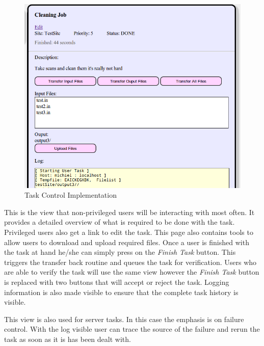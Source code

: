 \documentclass[12pt,a4paper]{report}
\begin{document}
\begin{description}
\begin{figure}[!h]
\begin{center}
            \includegraphics[scale=0.35]{figures/task_control_impl2.png}
        \end{center}
        \caption{Task Control Implementation}
        \label{task_control_impl2}
    \end{figure}
    This is the view that non-privileged users will be interacting with most often. It provides
    a detailed overview of what is required to be done with the task. Privileged users also
    get a link to edit the task. This page also contains tools to allow users to download
    and upload required files. Once a user is finished with the task at hand he/she can
    simply press on the \emph{Finish Task} button. This triggers the transfer back routine
    and queues the task for verification. Users who are able to verify the task will use the
    same view however the \emph{Finish Task} button is replaced with two buttons that will
    accept or reject the task. Logging information is also made visible to ensure that the
    complete task history is visible.

    This view is also used for server tasks. In this case the emphasis is on failure control.
    With the log visible user can trace the source of the failure and rerun the task as soon
    as it is has been dealt with.


\end{description}
\end{document}
